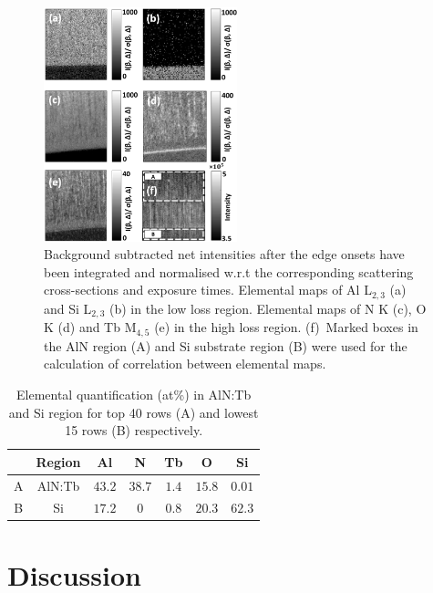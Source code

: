 \documentclass[%
aip,
rsi,%
 amsmath,amssymb,%
 reprint,%
]{revtex4-1}
\begin{document}
\begin{figure}%
    \includegraphics[width=0.5\textwidth]{combined_maps}
    \caption{Background subtracted net intensities after the edge onsets have been integrated and normalised w.r.t the corresponding scattering cross-sections and exposure times. Elemental maps of Al L$_{2,3}$ (a) and Si L$_{2,3}$ (b) in the low loss region. Elemental maps of N K (c), O K (d) and Tb M$_{4,5}$ (e) in the high loss region. (f)~Marked boxes in the AlN region (A) and Si substrate region (B) were used for the calculation of correlation between elemental maps.}
    \label{fig:combined_maps}
\end{figure}
\begin{table}%
	\caption{Elemental quantification (at\%) in AlN:Tb and Si region for top 40 rows (A) and lowest 15 rows (B) respectively.}
    \label{tab:atper}
    \begin{ruledtabular}
    	\begin{tabular}{ccccccc}
        	&Region&Al&N&Tb&O&Si						 \\ \hline
            A&AlN:Tb&$43.2$&$38.7$&$1.4$&$15.8$&$0.01$   \\
            B&Si &$17.2$&$0$&$0.8$&$20.3$&$62.3$
    	\end{tabular}
    \end{ruledtabular}
\end{table}

\section{Discussion} %
\label{sec:discussion}
\end{document}

